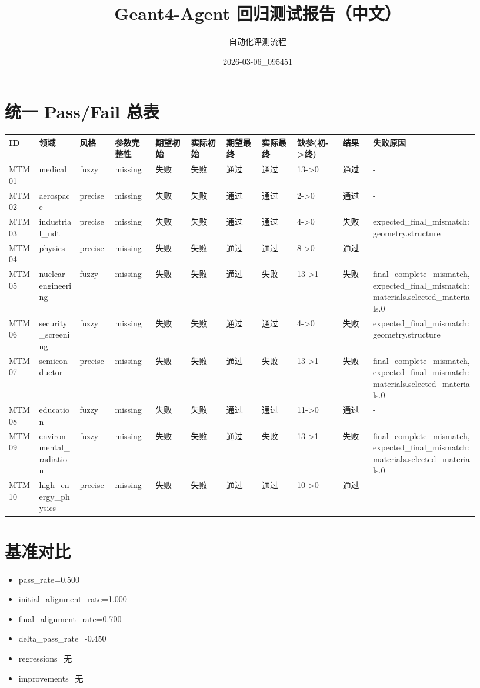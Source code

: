 \documentclass[11pt]{ctexart}
\title{Geant4-Agent 回归测试报告（中文）}
\author{自动化评测流程}
\date{2026-03-06\_095451}
\begin{document}
\maketitle
\section{统一 Pass/Fail 总表}
\begin{longtable}{p{0.06\linewidth}p{0.08\linewidth}p{0.07\linewidth}p{0.08\linewidth}p{0.07\linewidth}p{0.07\linewidth}p{0.07\linewidth}p{0.07\linewidth}p{0.09\linewidth}p{0.06\linewidth}p{0.21\linewidth}}
\toprule
ID & 领域 & 风格 & 参数完整性 & 期望初始 & 实际初始 & 期望最终 & 实际最终 & 缺参(初->终) & 结果 & 失败原因 \\
\midrule
MTM01 & medical & fuzzy & missing & 失败 & 失败 & 通过 & 通过 & 13->0 & 通过 & - \\
MTM02 & aerospace & precise & missing & 失败 & 失败 & 通过 & 通过 & 2->0 & 通过 & - \\
MTM03 & industrial\_ndt & precise & missing & 失败 & 失败 & 通过 & 通过 & 4->0 & 失败 & expected\_final\_mismatch:geometry.structure \\
MTM04 & physics & precise & missing & 失败 & 失败 & 通过 & 通过 & 8->0 & 通过 & - \\
MTM05 & nuclear\_engineering & fuzzy & missing & 失败 & 失败 & 通过 & 失败 & 13->1 & 失败 & final\_complete\_mismatch, expected\_final\_mismatch:materials.selected\_materials.0 \\
MTM06 & security\_screening & fuzzy & missing & 失败 & 失败 & 通过 & 通过 & 4->0 & 失败 & expected\_final\_mismatch:geometry.structure \\
MTM07 & semiconductor & precise & missing & 失败 & 失败 & 通过 & 失败 & 13->1 & 失败 & final\_complete\_mismatch, expected\_final\_mismatch:materials.selected\_materials.0 \\
MTM08 & education & fuzzy & missing & 失败 & 失败 & 通过 & 通过 & 11->0 & 通过 & - \\
MTM09 & environmental\_radiation & fuzzy & missing & 失败 & 失败 & 通过 & 失败 & 13->1 & 失败 & final\_complete\_mismatch, expected\_final\_mismatch:materials.selected\_materials.0 \\
MTM10 & high\_energy\_physics & precise & missing & 失败 & 失败 & 通过 & 通过 & 10->0 & 通过 & - \\
\bottomrule
\end{longtable}
\section{基准对比}
\begin{itemize}
\item pass\_rate=0.500
\item initial\_alignment\_rate=1.000
\item final\_alignment\_rate=0.700
\item delta\_pass\_rate=-0.450
\item regressions=无
\item improvements=无
\end{itemize}
\appendix
\end{document}
